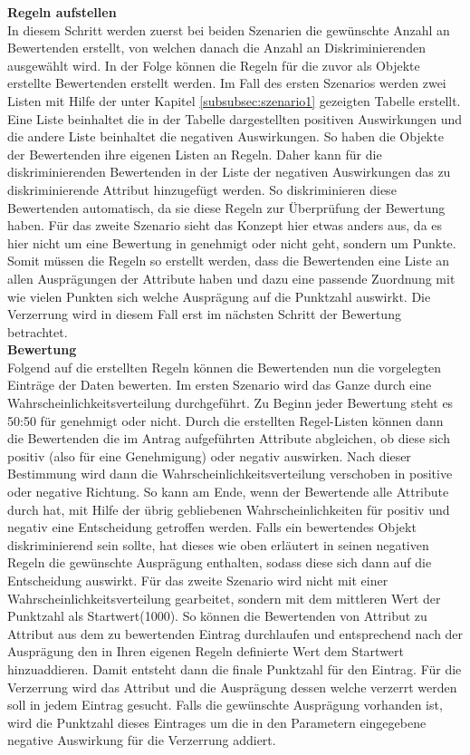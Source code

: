 \begin{onehalfspace}
\textbf{Regeln aufstellen}\\
In diesem Schritt werden zuerst bei beiden Szenarien die gewünschte Anzahl an Bewertenden erstellt, von welchen danach die Anzahl an Diskriminierenden ausgewählt wird. In der Folge können die Regeln für die zuvor als Objekte erstellte Bewertenden erstellt werden. Im Fall des ersten Szenarios werden zwei Listen mit Hilfe der unter Kapitel \ref{subsubsec:szenario1} gezeigten Tabelle erstellt. Eine Liste beinhaltet die in der Tabelle dargestellten positiven Auswirkungen und die andere Liste beinhaltet die negativen Auswirkungen. So haben die Objekte der Bewertenden ihre eigenen Listen an Regeln. Daher kann für die diskriminierenden Bewertenden in der Liste der negativen Auswirkungen das zu diskriminierende Attribut hinzugefügt werden. So diskriminieren diese Bewertenden automatisch, da sie diese Regeln zur Überprüfung der Bewertung haben. Für das zweite Szenario sieht das Konzept hier etwas anders aus, da es hier nicht um eine Bewertung in genehmigt oder nicht geht, sondern um Punkte. Somit müssen die Regeln so erstellt werden, dass die Bewertenden eine Liste an allen Ausprägungen der Attribute haben und dazu eine passende Zuordnung mit wie vielen Punkten sich welche Ausprägung auf die Punktzahl auswirkt. Die Verzerrung wird in diesem Fall erst im nächsten Schritt der Bewertung betrachtet.\\
\textbf{Bewertung}\\
Folgend auf die erstellten Regeln können die Bewertenden nun die vorgelegten Einträge der Daten bewerten. Im ersten Szenario wird das Ganze durch eine Wahrscheinlichkeitsverteilung durchgeführt. Zu Beginn jeder Bewertung steht es 50:50 für genehmigt oder nicht. Durch die erstellten Regel-Listen können dann die Bewertenden die im Antrag aufgeführten Attribute abgleichen, ob diese sich positiv (also für eine Genehmigung) oder negativ auswirken. Nach dieser Bestimmung wird dann die Wahrscheinlichkeitsverteilung verschoben in positive oder negative Richtung. So kann am Ende, wenn der Bewertende alle Attribute durch hat, mit Hilfe der übrig gebliebenen Wahrscheinlichkeiten für positiv und negativ eine Entscheidung getroffen werden. Falls ein bewertendes Objekt diskriminierend sein sollte, hat dieses wie oben erläutert in seinen negativen Regeln die gewünschte Ausprägung enthalten, sodass diese sich dann auf die Entscheidung auswirkt. Für das zweite Szenario wird nicht mit einer Wahrscheinlichkeitsverteilung gearbeitet, sondern mit dem mittleren Wert der Punktzahl als Startwert(1000). So können die Bewertenden von Attribut zu Attribut aus dem zu bewertenden Eintrag durchlaufen und entsprechend nach der Ausprägung den in Ihren eigenen Regeln definierte Wert dem Startwert hinzuaddieren. Damit entsteht dann die finale Punktzahl für den Eintrag. Für die Verzerrung wird das Attribut und die Ausprägung dessen welche verzerrt werden soll in jedem Eintrag gesucht. Falls die gewünschte Ausprägung vorhanden ist, wird die Punktzahl dieses Eintrages um die in den Parametern eingegebene negative Auswirkung für die Verzerrung addiert.\\

\end{onehalfspace}
